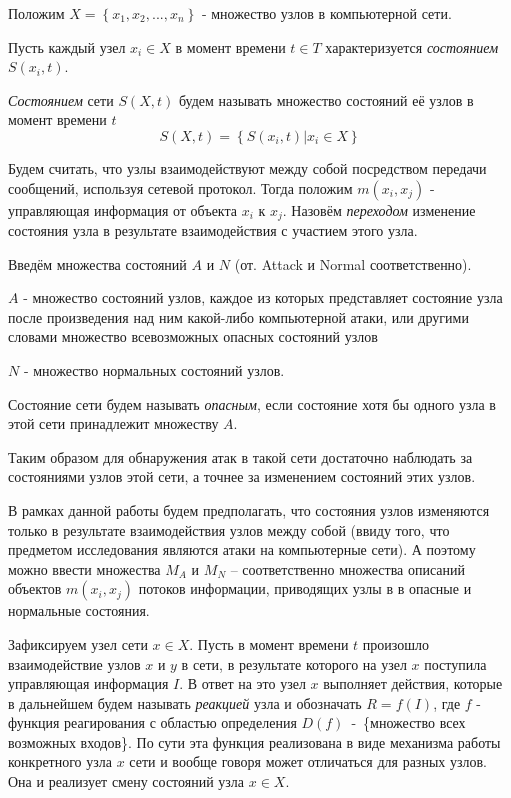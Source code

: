 \documentclass[12pt,a4paper]{article}
\begin{document}
Положим $X = \left\{x_1, x_2, ..., x_n\right\} $ - множество узлов в компьютерной сети.

Пусть каждый узел $x_i \in X$ в момент времени $t \in T$ характеризуется \textit{состоянием} $S(x_i, t)$.

\textit{Состоянием} сети $S(X, t)$ будем называть множество состояний её узлов в момент времени $t$
\begin{equation}
S(X, t) = \left\{S(x_i, t) | x_i \in X\right\}
\end{equation}


Будем считать, что узлы взаимодействуют между собой посредством передачи сообщений, используя сетевой протокол. Тогда положим $m(x_i, x_j)$ - управляющая информация от объекта $x_i$ к $x_j$. Назовём \textit{переходом} изменение состояния узла в результате взаимодействия с участием этого узла. 

Введём множества состояний $A$ и $N$ (от. Attack и Normal соответственно).

$A$ - множество состояний узлов, каждое из которых представляет состояние узла после произведения над ним какой-либо компьютерной атаки, или другими словами множество всевозможных опасных состояний узлов

$N$ - множество нормальных состояний узлов.

Состояние сети будем называть \textit{опасным}, если состояние хотя бы одного узла в этой сети принадлежит множеству $A$.

Таким образом для обнаружения атак в такой сети достаточно наблюдать за состояниями узлов этой сети, а точнее за изменением состояний этих узлов. 

В рамках данной работы будем предполагать, что состояния узлов изменяются только в результате взаимодействия узлов между собой (ввиду того, что предметом исследования являются атаки на компьютерные сети). А поэтому можно ввести множества $M_A$ и $M_N$ -- соответственно множества описаний объектов $m(x_i, x_j)$ потоков информации, приводящих узлы в в опасные и нормальные состояния.


Зафиксируем узел сети $x \in X$. 
Пусть в момент времени $t$ произошло взаимодействие узлов $x$ и $y$ в сети, в результате которого на узел $x$ поступила управляющая информация $I$. В ответ на это узел $x$ выполняет действия, которые в дальнейшем будем называть \textit{реакцией} узла и обозначать $R = f(I)$, где $f$ - функция реагирования с областью определения $D(f)$~-~\{множество всех возможных входов\}. По сути эта функция реализована в виде механизма работы конкретного узла $x$ сети и вообще говоря может отличаться для разных узлов. Она и реализует смену состояний узла $x \in X$.
\end{document}
